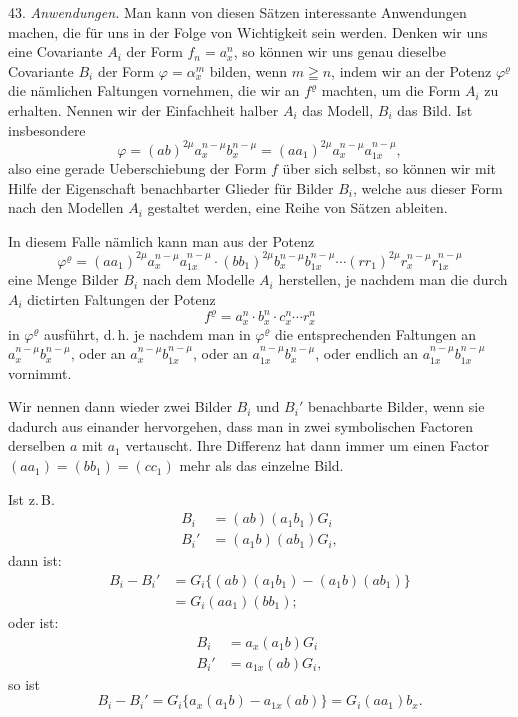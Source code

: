 \documentclass[11pt]{article}
\begin{document}
43. \textit{Anwendungen.} Man kann von diesen Sätzen interessante Anwendungen
machen, die für uns in der Folge von Wichtigkeit sein werden. Denken wir uns
eine Covariante $A_i$ der Form $f_n=a_x^n$, so können wir uns genau dieselbe
Covariante $B_i$ der Form $\varphi=\alpha_x^m$ bilden, wenn $m\geqq n$, indem
wir an der Potenz $\varphi^\varrho$ die nämlichen Faltungen vornehmen, die wir
an $f^\varrho$ machten, um die Form $A_i$ zu erhalten. Nennen wir der
Einfachheit halber $A_i$ das Modell, $B_i$ das Bild. Ist insbesondere
\[
\varphi=(ab)^{2\mu}a_x^{n-\mu}b_x^{n-\mu}=(aa_1)^{2\mu}a_x^{n-\mu}a_{1x}^{n-\mu}, %
\]
also eine gerade Ueberschiebung der Form $f$ über sich selbst, so können wir
mit Hilfe der Eigenschaft benachbarter Glieder für Bilder $B_i$, welche aus
dieser Form nach den Modellen $A_i$ gestaltet werden, eine Reihe von Sätzen
ableiten.

In diesem Falle nämlich kann man aus der Potenz
\[
\varphi^\varrho=(aa_1)^{2\mu}a_x^{n-\mu}a_{1x}^{n-\mu}\cdot(bb_1)^{2\mu}b_x^{n-\mu}b_{1x}^{n-\mu}\cdots(rr_1)^{2\mu}r_x^{n-\mu}r_{1x}^{n-\mu} %
\]
eine Menge Bilder $B_i$ nach dem Modelle $A_i$ herstellen, je nachdem man die
durch $A_i$ dictirten Faltungen der Potenz
\[
f^\varrho=a_x^n\cdot b_x^n\cdot c_x^n\cdots r_x^n
\]
in $\varphi^\varrho$ ausführt, d.\,h. je nachdem man in $\varphi^\varrho$ die
entsprechenden Faltungen an $a_x^{n-\mu}b_x^{n-\mu}$, oder an
$a_x^{n-\mu}b_{1x}^{n-\mu}$, oder an $a_{1x}^{n-\mu}b_x^{n-\mu}$, oder
endlich an $a_{1x}^{n-\mu}b_{1x}^{n-\mu}$ vornimmt.

Wir nennen dann wieder zwei Bilder $B_i$ und $B_i'$ benachbarte Bilder, wenn
sie dadurch aus einander hervorgehen, dass man in zwei symbolischen Factoren
derselben $a$ mit $a_1$ vertauscht. Ihre Differenz hat dann immer um einen
Factor $(aa_1)=(bb_1)=(cc_1)$ mehr als das einzelne Bild.

Ist z.\,B.
\[
\begin{aligned}
B_i&=(ab)(a_1b_1)G_i\\
B_i'&=(a_1b)(ab_1)G_i,
\end{aligned}
\]
dann ist:
\[
\begin{aligned}
B_i-B_i'&=G_i\{(ab)(a_1b_1)-(a_1b)(ab_1)\}\\
&=G_i(aa_1)(bb_1);
\end{aligned}
\]
oder ist:
\[
\begin{aligned}
B_i&=a_x(a_1b)G_i\\
B_i'&=a_{1x}(ab)G_i,
\end{aligned}
\]
so ist
\[
B_i-B_i'=G_i\{a_x(a_1b)-a_{1x}(ab)\}=G_i(aa_1)b_x.
\]
\end{document}
